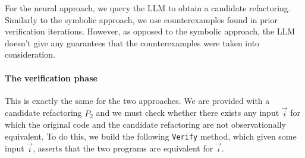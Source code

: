 \documentclass[sigconf,review,anonymous]{acmart}
\begin{document}
For the neural approach, we query the LLM to obtain a candidate refactoring. Similarly to the symbolic approach, we use counterexamples found in prior verification
iterations. However, as opposed to the symbolic approach, the LLM doesn't give any guarantees that the counterexamples were taken into consideration.






\paragraph{The verification phase}
This is exactly the same for the two approaches.
We are provided with a candidate
refactoring $P_2$ and we must check whether there exists any input
$\vec{i}$ for which the original code and the candidate
refactoring are not observationally equivalent.  To do this, we build
the following \texttt{Verify} method, which given some input
$\vec{i}$, asserts that the two programs are equivalent for
$\vec{i}$.
\end{document}
